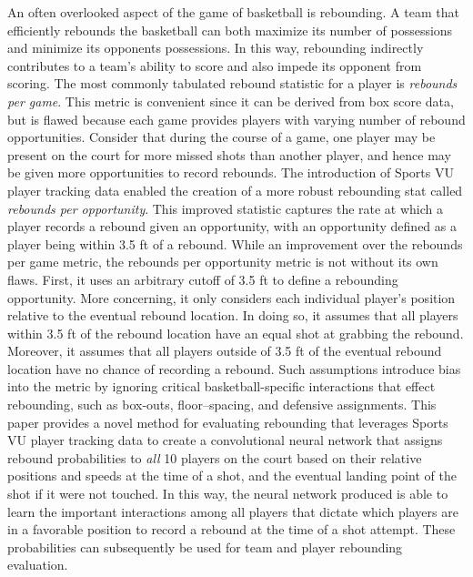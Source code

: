 \documentclass{article}
\begin{document}
\noindent
An often overlooked aspect of the game of basketball is rebounding. A team that efficiently rebounds the basketball can both maximize its number of possessions and minimize its opponents possessions. In this way, rebounding indirectly contributes to a team's ability to score and also impede its opponent from scoring.
\bigbreak
\noindent
The most commonly tabulated rebound statistic for a player is {\it rebounds per game}. This metric is convenient since it can be derived from box score data, but is flawed because each game provides players with varying number of rebound opportunities. Consider that during the course of a game, one player may be present on the court for more missed shots than another player, and hence may be given more opportunities to record rebounds. The introduction of Sports VU player tracking data enabled the creation of a more robust rebounding stat called {\it rebounds per opportunity}. This improved statistic captures the rate at which a player records a rebound given an opportunity, with an opportunity defined as a player being within 3.5 ft of a rebound.
\bigbreak
\noindent
While an improvement over the rebounds per game metric, the rebounds per opportunity metric is not without its own flaws. First, it uses an arbitrary cutoff of 3.5 ft to define a rebounding opportunity. More concerning, it only considers each individual player's position relative to the eventual rebound location. In doing so, it assumes that all players within 3.5 ft of the rebound location have an equal shot at grabbing the rebound. Moreover, it assumes that all players outside of 3.5 ft of the eventual rebound location have no chance of recording a rebound. Such assumptions introduce bias into the metric by ignoring critical basketball-specific interactions that effect rebounding, such as box-outs, floor--spacing, and defensive assignments.
\bigbreak
\noindent
This paper provides a novel method for evaluating rebounding that leverages Sports VU player tracking data to create a convolutional neural network that assigns rebound probabilities to {\it all} 10 players on the court based on their relative positions and speeds at the time of a shot, and the eventual landing point of the shot if it were not touched. In this way, the neural network produced is able to learn the important interactions among all players that dictate which players are in a favorable position to record a rebound at the time of a shot attempt. These probabilities can subsequently be used for team and player rebounding evaluation.

\clearpage
\end{document}
